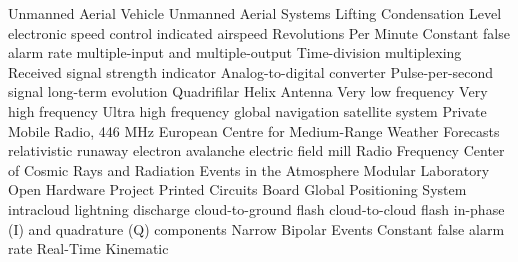  {Unmanned Aerial Vehicle}
 {Unmanned Aerial Systems}
 {Lifting Condensation Level}
 {electronic speed control}
 {indicated airspeed}
 {Revolutions Per Minute}
 {Constant false alarm rate}
 {multiple-input and multiple-output}
 {Time-division multiplexing}
 {Received signal strength indicator}
 {Analog-to-digital converter}
 {Pulse-per-second signal}
 {long-term evolution}
 {Quadrifilar Helix Antenna}
 {Very low frequency}
 {Very high frequency}
 {Ultra high frequency}
 {global navigation satellite system}
 {Private Mobile Radio, 446 MHz}
 {European Centre for Medium-Range Weather Forecasts}
 {relativistic runaway electron avalanche}
 {electric field mill}
 {Radio Frequency}
 {Center of Cosmic Rays and Radiation Events in the Atmosphere}
 {Modular Laboratory Open Hardware Project}
 {Printed Circuits Board}
 {Global Positioning System}
 {intracloud lightning discharge}
 {cloud-to-ground flash}
 {cloud-to-cloud flash}
 {in-phase (I) and quadrature (Q) components}
 {Narrow Bipolar Events}
 {Constant false alarm rate}
 {Real-Time Kinematic}


